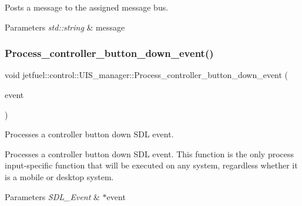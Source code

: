Posts a message to the assigned message bus.


\begin{DoxyParams}{Parameters}
{\em std\+::string} & message \\
\hline
\end{DoxyParams}
\mbox{\label{classjetfuel_1_1control_1_1UIS__manager_ab20315b3fd2a89c8f21058385a4ce672}} 
\subsubsection{\texorpdfstring{Process\+\_\+controller\+\_\+button\+\_\+down\+\_\+event()}{Process\_controller\_button\_down\_event()}}
{\footnotesize\ttfamily void jetfuel\+::control\+::\+U\+I\+S\+\_\+manager\+::\+Process\+\_\+controller\+\_\+button\+\_\+down\+\_\+event (\begin{DoxyParamCaption}\item[{S\+D\+L\+\_\+\+Event $\ast$}]{event }\end{DoxyParamCaption})\hspace{0.3cm}{\ttfamily [protected]}}



Processes a controller button down S\+DL event. 

Processes a controller button down S\+DL event. This function is the only process input-\/specific function that will be executed on any system, regardless whether it is a mobile or desktop system.


\begin{DoxyParams}{Parameters}
{\em S\+D\+L\+\_\+\+Event} & $\ast$event \\
\hline
\end{DoxyParams}
\mbox{\label{classjetfuel_1_1control_1_1UIS__manager_a389d615922d1d3f408e46ae05c37d125}} 
